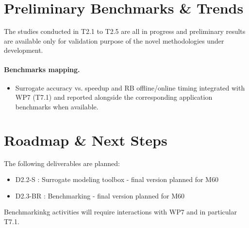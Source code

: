 \section{Preliminary Benchmarks \& Trends}

The  studies  conducted in  T2.1  to  T2.5  are  all in  progress  and
preliminary results are  available only for validation  purpose of the
novel methodologies under development. 

\paragraph{Benchmarks mapping.}
\begin{itemize}
  \item Surrogate accuracy vs. speedup and RB offline/online timing integrated with WP7 (T7.1) and reported alongside the corresponding application benchmarks when available.
\end{itemize}

\section{Roadmap \& Next Steps}

The following deliverables are planned: 
\begin{itemize}
\item D2.2-S : Surrogate modeling toolbox - final version planned for M60
\item D2.3-BR : Benchmarking - final version planned for M60
\end{itemize}

Benchmarkinkg activities will require interactions with WP7 and in particular T7.1.
